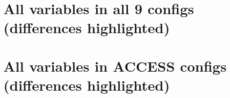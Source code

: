 \documentclass[10pt]{article}
\newcommand{\nmldiffer}[1]{#1} %
\newcommand{\doscript}[1]{{\footnotesize\textsf{}}}
\begin{document}

\newpage
\section{All variables in all 9 configs (differences highlighted)}
\renewcommand{\nmldiffer}[1]{\colorbox{hilite}{#1}}\setlength{\fboxsep}{0pt} %
\doscript{/Users/andy/anaconda/bin/python3 /Users/andy/bin/nmltab.py --format latex original/GFDL_ESM2M_input-cut.nml original/MOM_SIS_TOPAZ_input.nml original/fabio_momsis1_input.nml original/paul_momsis025_input.nml original/fanghua_momsis01v5KDS75_WOA13_input.nml original/russ-accessom-mom4p1-input.nml new_accessom2_1deg_jra55_ryf_input.nml new_accessom2_025deg_jra55_ryf_input.nml new_accessom2_01deg_jra55_ryf_input.nml}

\newpage
\section{All variables in ACCESS configs (differences highlighted)}
\renewcommand{\nmldiffer}[1]{\colorbox{hilite}{#1}}\setlength{\fboxsep}{0pt} %
\doscript{/Users/andy/anaconda/bin/python3 /Users/andy/bin/nmltab.py --format latex original/russ-accessom-mom4p1-input.nml new_accessom2_1deg_jra55_ryf_input.nml new_accessom2_025deg_jra55_ryf_input.nml new_accessom2_01deg_jra55_ryf_input.nml}

\end{document}
